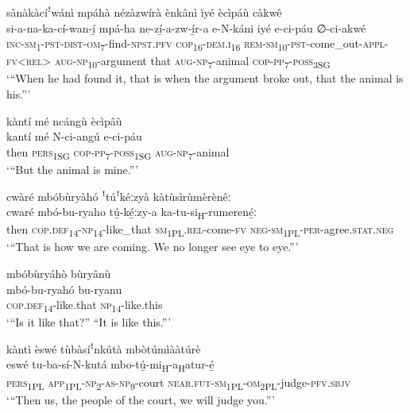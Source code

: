 sànàkàcíꜝwánì mpáhà nézàzwírà ènkânì ìyé ècìpáù càkwê\\
\gll si-a-na-ka-cí-wan-í̲  mpá-ha    ne-zí̲-a-zw-í̲r-a  e-N-káni       iyé  e-ci-páu    ∅-ci-akwé\\
\textsc{inc}{}-\textsc{sm}\textsubscript{1}{}-\textsc{pst}{}-\textsc{dist}{}-\textsc{om}\textsubscript{7}{}-find-\textsc{npst}.\textsc{pfv}
\textsc{cop}\textsubscript{16}{}-\textsc{dem}.\textsc{i}\textsubscript{16}  \textsc{rem}{}-\textsc{sm}\textsubscript{10}{}-\textsc{pst}{}-come\_out-\textsc{appl}{}-\textsc{fv}<\textsc{rel}>
\textsc{aug}{}-\textsc{np}\textsubscript{10}{}-argument  that  \textsc{aug}{}-\textsc{np}\-\textsubscript{7}{}-animal  \textsc{cop}{}-\textsc{pp}\textsubscript{7}{}-\textsc{poss}\textsubscript{3SG}\\
\glt ‘“When he had found it, that is when the argument broke out, that the animal is his.”’\bigskip

kàntí mé ncángù ècìpâù\\
\gll kantí  mé    N-ci-angú    e-ci-páu\\
then  \textsc{pers}\textsubscript{1SG}    \textsc{cop}{}-\textsc{pp}\textsubscript{7}{}-\textsc{poss}\textsubscript{1SG}  \textsc{aug}{}-\textsc{np}\textsubscript{7}{}-animal\\
\glt ‘“But the animal is mine.”’\bigskip

cwàré mbóbùryàhó ꜝtúꜝkéːzyà kàtùsìrùmèrènêː\\
\gll cwaré  mbó-bu-ryaho    tú̲-ké̲ːzy-a    ka-tu-si\textsubscript{H}{}-rumerené̲ː\\
then  \textsc{cop}.\textsc{def}\textsubscript{14}{}-\textsc{np}\textsubscript{14}{}-like\_that  \textsc{sm}\textsubscript{1PL}.\textsc{rel}{}-come-\textsc{fv}  \textsc{neg}{}-\textsc{sm}\textsubscript{1PL}{}-\textsc{per}{}-agree.\textsc{stat}.\textsc{neg}\\
\glt ‘“That is how we are coming. We no longer see eye to eye.”’\bigskip

mbóbùryáhò bùryânù\\
\gll mbó-bu-ryahó  bu-ryanu\\
\textsc{cop}.\textsc{def}\textsubscript{14}{}-like.that  \textsc{np}\textsubscript{14}{}-like.this\\
\glt ‘“Is it like that?” “It is like this.”’\bigskip

\newpage
kàntì èswé tùbàsíꜝnkútà mbòtúmìààtúrè\\
\gll eswé    tu-ba-sí-N-kutá    mbo-tú̲-mi\textsubscript{H}{}-a\textsubscript{H}atur-é̲\\
\textsc{pers}\textsubscript{1PL}  \textsc{app}\textsubscript{1PL}{}-\textsc{np}\textsubscript{2}{}-\textsc{as}{}-\textsc{np}\textsubscript{9}{}-court  \textsc{near}.\textsc{fut}{}-\textsc{sm}\textsubscript{1PL}{}-\textsc{om}\textsubscript{2PL}{}-judge-\textsc{pfv}.\textsc{sbjv}\\
\glt ‘“Then us, the people of the court, we will judge you.”’\bigskip

